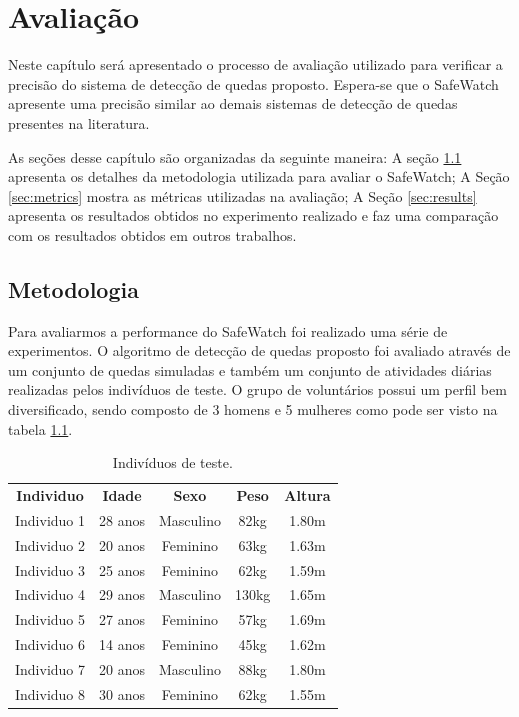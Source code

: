\chapter{Avaliação}
\label{cap:avaliacao}

Neste capítulo será apresentado o processo de avaliação utilizado para verificar a precisão do sistema de detecção de quedas proposto. Espera-se que o SafeWatch apresente uma precisão similar ao demais sistemas de detecção de quedas presentes na literatura.

As seções desse capítulo são organizadas da seguinte maneira: A seção \ref{sec:metodology} apresenta os detalhes da metodologia utilizada para avaliar o SafeWatch; A Seção \ref{sec:metrics} mostra as métricas utilizadas na avaliação; A Seção \ref{sec:results} apresenta os resultados obtidos no experimento realizado e faz uma comparação com os resultados obtidos em outros trabalhos.



\section{Metodologia}
\label{sec:metodology}

Para avaliarmos a performance do SafeWatch foi realizado uma série de experimentos. O algoritmo de detecção de quedas proposto foi avaliado através de um conjunto de quedas simuladas e também um conjunto de atividades diárias realizadas pelos indivíduos de teste. O grupo de voluntários possui um perfil bem diversificado, sendo composto de 3 homens e 5 mulheres como pode ser visto na tabela \ref{tab:experiment}.


\begin{table}[h]
	\centering
	\caption{Indivíduos de teste.}
	\label{tab:experiment}
	\begin{tabular}{c|c|c|c|c}
		\hline
		\textbf{Individuo}  & \textbf{Idade} 	& \textbf{Sexo}   &    \textbf{Peso}    & \textbf{Altura} 	 \\
		Individuo 1         &    28 anos         & Masculino            & 82kg      		& 1.80m          \\  
		Individuo 2         &    20 anos         & Feminino             & 63kg      		& 1.63m          \\
		Individuo 3         &    25 anos         & Feminino             & 62kg      		& 1.59m          \\ 
		Individuo 4         &    29 anos         & Masculino            & 130kg      		& 1.65m          \\ 
		Individuo 5         &    27 anos         & Feminino             & 57kg      		& 1.69m          \\ 
		Individuo 6         &    14 anos         & Feminino             & 45kg      		& 1.62m          \\
		Individuo 7         &    20 anos         & Masculino            & 88kg      		& 1.80m          \\ 
		Individuo 8         &    30 anos         & Feminino             & 62kg      		& 1.55m          \\   
	\end{tabular}
\end{table}

